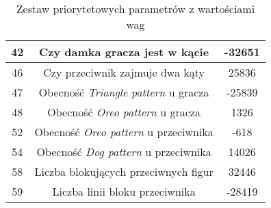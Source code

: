 {\begin{center}
\begin{table}
{\begin{tabular}{|| c | c | c ||}
 42 & Czy damka gracza jest w kącie & -32651 \\
 \hline
 46 & Czy przeciwnik zajmuje dwa kąty & 25836 \\
 \hline
 47 & Obecność \textit{Triangle pattern} u gracza & -25839 \\
 \hline
 48 & Obecność \textit{Oreo pattern} u gracza & 1326 \\
 \hline
 52 & Obecność \textit{Oreo pattern} u przeciwnika & -618 \\
 \hline
 54 & Obecność \textit{Dog pattern} u przeciwnika & 14026 \\
 \hline
 58 & Liczba blokujących przeciwnych figur & 32446 \\
 \hline
 59 & Liczba linii bloku przeciwnika & -28419 \\
 \hline
\end{tabular}
}
\caption{Zestaw priorytetowych parametrów z wartościami wag}
\label{tab:results-params-opt}
\end{table}
\end{center}
}


